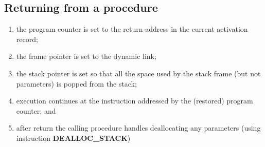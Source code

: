 \documentclass[fontsize=10pt,a4paper]{article}
\begin{document}
\begin{multicols}{3}
    \subsection{Returning from a procedure}

    \begin{enumerate}
        \item the program counter is set to the return address in the current activation record;
        \item the frame pointer is set to the dynamic link;
        \item the stack pointer is set so that all the space used by the stack frame (but not parameters) is popped from the stack;
        \item execution continues at the instruction addressed by the (restored) program counter; and
        \item after return the calling procedure handles deallocating any parameters (using instruction \textbf{DEALLOC\_STACK})
    \end{enumerate}


\end{multicols}
\end{document}
